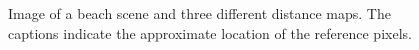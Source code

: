 \documentclass[11pt,a4paper]{article}
\begin{document}
\begin{figure}
\centering
{}
\quad
{}

\quad
{}
\caption{Image of a beach scene and three different distance maps. The captions indicate the approximate location of the reference pixels. }
\label{fig:3}
\end{figure}
\end{document}
